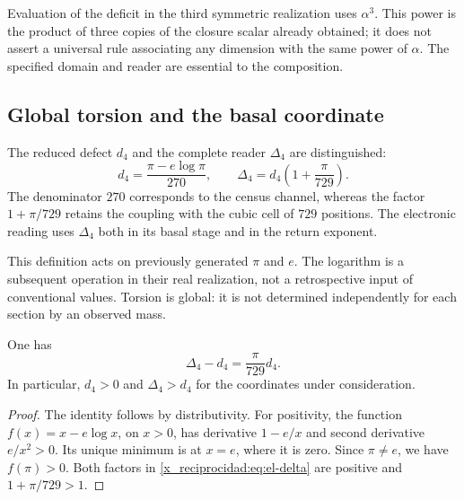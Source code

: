Evaluation of the deficit in the third symmetric realization uses
\(\alpha^3\). This power is the product of three copies of the
closure scalar already obtained; it does not assert a universal rule
associating any dimension with the same power of \(\alpha\).
The specified domain and reader are essential to the composition.

\subsection{Global torsion and the basal coordinate}

\begin{definition}
The reduced defect \(d_4\) and the complete reader
\(\Delta_4\) are distinguished:
\begin{equation}
 d_4=\frac{\pi-e\log\pi}{270},\qquad
 \Delta_4=d_4\left(1+\frac{\pi}{729}\right).
 \label{x_reciprocidad:eq:el-delta}
\end{equation}
The denominator \(270\) corresponds to the census channel, whereas the
factor \(1+\pi/729\) retains the coupling with the cubic cell of
\(729\) positions. The electronic reading uses \(\Delta_4\) both in
its basal stage and in the return exponent.
\end{definition}

This definition acts on previously generated \(\pi\) and \(e\). The
logarithm is a subsequent operation in their real realization, not a
retrospective input of conventional values. Torsion is global:
it is not determined independently for each section by an observed
mass.

\begin{lemma}
One has
\begin{equation}
 \Delta_4-d_4=\frac{\pi}{729}d_4.
 \label{x_reciprocidad:eq:el-delta-diferencia}
\end{equation}
In particular, \(d_4>0\) and \(\Delta_4>d_4\) for the coordinates
under consideration.
\end{lemma}
\begin{proof}
The identity follows by distributivity. For positivity, the function
\(f(x)=x-e\log x\), on \(x>0\), has derivative \(1-e/x\) and
second derivative \(e/x^2>0\). Its unique minimum is at \(x=e\), where
it is zero. Since \(\pi\ne e\), we have \(f(\pi)>0\). Both factors
in \eqref{x_reciprocidad:eq:el-delta} are positive and \(1+\pi/729>1\).
\end{proof}

